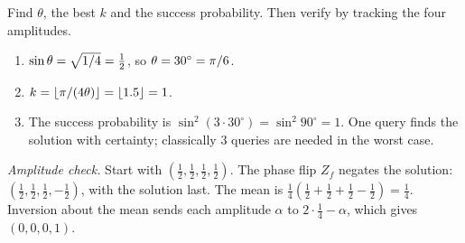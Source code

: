\begin{exercisebox}
\begin{pproblem}[$N = 4$, $a = 1$]\label{pp:grover4}
    Find $\theta$, the best $k$ and the success probability. Then verify by tracking the four
    amplitudes.
\end{pproblem}
\tcblower
\begin{wsolution}
    \leavevmode
    \begin{enumerate}
        \item $\sin\theta = \sqrt{1/4} = \frac{1}{2}$, so $\theta = 30^\circ = \pi/6$.
        \item $k = \floor{\sfrac{\pi}{(4\theta)}} = \floor{1.5} = 1$.
        \item The success probability is $\sin^2(3 \cdot 30^\circ) = \sin^2 90^\circ = 1$. One query
              finds the solution with certainty; classically $3$ queries are needed in the worst
              case.
    \end{enumerate}

    \emph{Amplitude check.} Start with $\left(\frac{1}{2}, \frac{1}{2}, \frac{1}{2}, \frac{1}{2}\right)$.
    The phase flip $Z_f$ negates the solution:
    $\left(\frac{1}{2}, \frac{1}{2}, \frac{1}{2}, -\frac{1}{2}\right)$, with the solution last. The
    mean is $\frac{1}{4}\left(\frac{1}{2} + \frac{1}{2} + \frac{1}{2} - \frac{1}{2}\right) = \frac{1}{4}$.
    Inversion about the mean sends each amplitude $\alpha$ to $2 \cdot \frac{1}{4} - \alpha$, which
    gives $(0, 0, 0, 1)$.
\end{wsolution}
\end{exercisebox}

